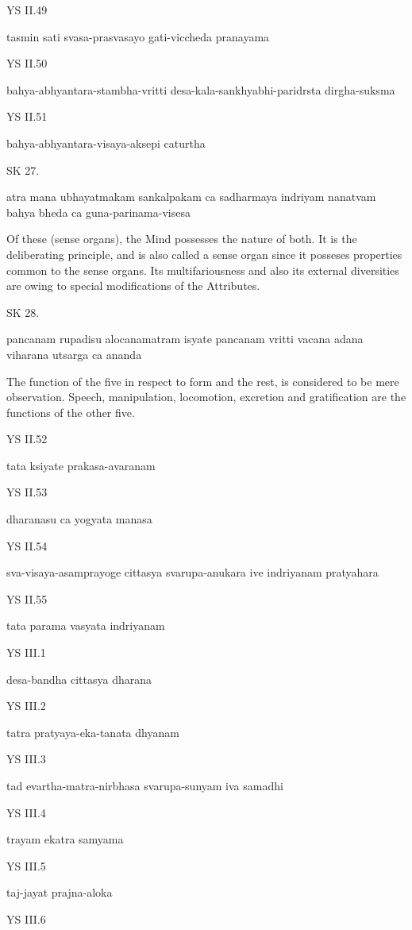 YS II.49

    tasmin sati svasa-prasvasayo gati-viccheda pranayama

YS II.50

    bahya-abhyantara-stambha-vritti
    desa-kala-sankhyabhi-paridrsta dirgha-suksma

YS II.51

    bahya-abhyantara-visaya-aksepi caturtha

SK 27.

atra mana ubhayatmakam sankalpakam ca sadharmaya indriyam
nanatvam bahya bheda ca guna-parinama-visesa

Of these (sense organs), the Mind possesses the nature of both.
It is the deliberating principle, and is also called a sense organ
since it posseses properties common to the sense organs.
Its multifariousness and also its external diversities are owing
to special modifications of the Attributes.

SK 28.

pancanam rupadisu alocanamatram isyate
pancanam vritti vacana adana viharana utsarga ca ananda

The function of the five in respect to form and the rest,
is considered to be mere observation.
Speech, manipulation, locomotion, excretion and gratification
are the functions of the other five.

YS II.52

    tata ksiyate prakasa-avaranam

YS II.53

    dharanasu ca yogyata manasa

YS II.54

    sva-visaya-asamprayoge cittasya svarupa-anukara ive indriyanam pratyahara

YS II.55

    tata parama vasyata indriyanam

YS III.1

    desa-bandha cittasya dharana

YS III.2

    tatra pratyaya-eka-tanata dhyanam

YS III.3

    tad evartha-matra-nirbhasa svarupa-sunyam iva samadhi

YS III.4

    trayam ekatra samyama

YS III.5

    taj-jayat prajna-aloka

YS III.6

